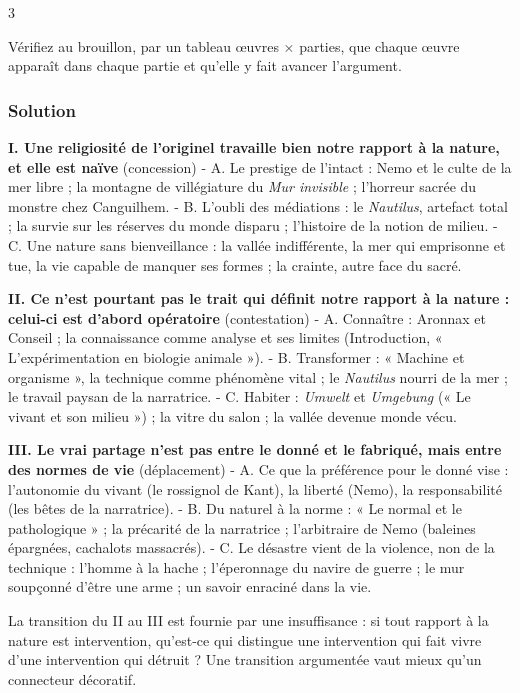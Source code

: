 \documentclass[11pt,a4paper]{article}
\begin{document}
\begin{indication}{3}

Vérifiez au brouillon, par un tableau œuvres × parties, que chaque œuvre apparaît dans chaque partie et qu'elle y fait avancer l'argument.

\end{indication}

\hypertarget{solution-5}{%
\subsubsection{Solution}\label{solution-5}}

\textbf{I. Une religiosité de l'originel travaille bien notre rapport à la nature, et elle est naïve} (concession)
- A. Le prestige de l'intact : Nemo et le culte de la mer libre ; la montagne de villégiature du \emph{Mur invisible} ; l'horreur sacrée du monstre chez Canguilhem.
- B. L'oubli des médiations : le \emph{Nautilus}, artefact total ; la survie sur les réserves du monde disparu ; l'histoire de la notion de milieu.
- C. Une nature sans bienveillance : la vallée indifférente, la mer qui emprisonne et tue, la vie capable de manquer ses formes ; la crainte, autre face du sacré.

\textbf{II. Ce n'est pourtant pas le trait qui définit notre rapport à la nature : celui-ci est d'abord opératoire} (contestation)
- A. Connaître : Aronnax et Conseil ; la connaissance comme analyse et ses limites (Introduction, « L'expérimentation en biologie animale »).
- B. Transformer : « Machine et organisme », la technique comme phénomène vital ; le \emph{Nautilus} nourri de la mer ; le travail paysan de la narratrice.
- C. Habiter : \emph{Umwelt} et \emph{Umgebung} (« Le vivant et son milieu ») ; la vitre du salon ; la vallée devenue monde vécu.

\textbf{III. Le vrai partage n'est pas entre le donné et le fabriqué, mais entre des normes de vie} (déplacement)
- A. Ce que la préférence pour le donné vise : l'autonomie du vivant (le rossignol de Kant), la liberté (Nemo), la responsabilité (les bêtes de la narratrice).
- B. Du naturel à la norme : « Le normal et le pathologique » ; la précarité de la narratrice ; l'arbitraire de Nemo (baleines épargnées, cachalots massacrés).
- C. Le désastre vient de la violence, non de la technique : l'homme à la hache ; l'éperonnage du navire de guerre ; le mur soupçonné d'être une arme ; un savoir enraciné dans la vie.

\begin{methode}

La transition du II au III est fournie par une insuffisance : si tout rapport à la nature est intervention, qu'est-ce qui distingue une intervention qui fait vivre d'une intervention qui détruit ? Une transition argumentée vaut mieux qu'un connecteur décoratif.

\end{methode}
\end{document}
